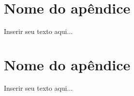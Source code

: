 %
%

\begin{apendicesenv}
\partapendices

\chapter{Nome do apêndice}
\label{chap:apendicex}

Inserir seu texto aqui...

\chapter{Nome do apêndice}
\label{chap:apendicey}

Inserir seu texto aqui...

\end{apendicesenv}